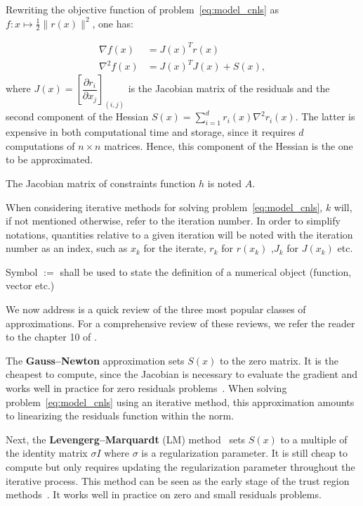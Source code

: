 \documentclass[10pt]{article}
\numberwithin{equation}{section}
\begin{document}
	 Rewriting the objective function of problem~\eqref{eq:model_cnls} as $f\colon x \mapsto  \frac{1}{2} \|r(x)\|^2$, one has:
	 
	 \begin{subequations}
	 		\begin{align}
	 		\nabla f(x) &= J(x)^Tr(x)\label{subeq:ls_grad} \\
	 		\nabla^2 f(x) &= J(x)^TJ(x) + S(x) , \label{subeq:ls_hessian}
	 		\end{align}
	 \end{subequations}
	 where $J(x) = \left[\dfrac{\partial r_i}{\partial x_j}\right]_{(i,j)}$ is the Jacobian matrix of the residuals and the second component of the Hessian $S(x) = \sum_{i=1}^{d} r_i(x) \nabla^2r_i(x) $. The latter is expensive in both computational time and storage, since it requires $d$ computations of $n\times n$ matrices. Hence, this component of the Hessian is the one to be approximated. 
	 
	 The Jacobian matrix of constraints function $h$ is noted $A$.
	 
	 When considering iterative methods for solving problem~\eqref{eq:model_cnls}, $k$ will, if not mentioned otherwise, refer to the iteration number. In order to simplify notations, quantities relative to a given iteration will be noted with the iteration number as an index, such as $x_k$ for the iterate, $r_k$ for $r(x_k)$ ,$J_k$ for $J(x_k)$ etc.
	 
	 Symbol $:=$ shall be used to state the definition of a numerical object (function, vector etc.)
	 
	 We now address is a quick review of the three most popular classes of approximations. For a comprehensive review of these reviews, we refer the reader to the chapter 10 of \cite{dennisschnabel:1996}.
	 
	 The \textbf{Gauss--Newton} approximation sets $S(x)$ to the zero matrix. It is the cheapest to compute, since the Jacobian is necessary to evaluate the gradient and works well in practice for zero residuals problems~\cite{dennisschnabel:1996}. When solving problem~\eqref{eq:model_cnls} using an iterative method, this approximation amounts to linearizing the residuals function within the norm.
	 
	 Next, the \textbf{Levengerg--Marquardt} (LM) method~\cite{levenberg:1944,marquardt:1963} sets $S(x)$ to a multiple of the identity matrix $\sigma I$ where $\sigma$ is a regularization parameter. It is still cheap to compute but only requires updating the regularization parameter throughout the iterative process. This method can be seen as the early stage of the trust region methods~\cite{conn-etal:2000}. It works well in practice on zero and small residuals problems. 
	 
\end{document}
